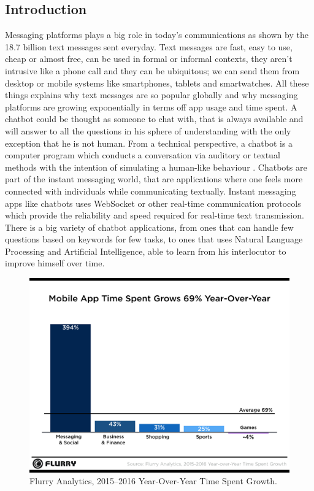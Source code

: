 \documentclass[b5paper,10pt,twoside,cucitura]{toptesi}
\begin{document}
\subsection{Introduction}
Messaging platforms plays a big role in today's communications as shown by the 18.7 billion text messages sent everyday. Text messages are fast, easy to use, cheap or almost free, can be used in formal or informal contexts, they aren't intrusive like a phone call and they can be ubiquitous; we can send them from desktop or mobile systems like smartphones, tablets and smartwatches. All these things explains why text messages are so popular globally and why messaging platforms are growing exponentially in terms off app usage and time spent.
A chatbot could be thought as someone to chat with, that is always available and will answer to all the questions in his sphere of understanding with the only exception that he is not human. From a technical perspective, a chatbot is a computer program which conducts a conversation via auditory or textual methods with the intention of simulating a human-like behaviour   \citep{techtarget}. Chatbots are part of the instant messaging world, that are applications where one feels more connected with individuals while communicating textually.
Instant messaging apps like chatbots uses WebSocket or other real-time communication protocols which provide the reliability and speed required for real-time text transmission. There is a big variety of chatbot applications, from ones that can handle few questions based on keywords for few tasks, to ones that uses Natural Language Processing and Artificial Intelligence, able to learn from his interlocutor to improve himself over time.


\begin{figure}[h]
\centering 
\includegraphics[width=\textwidth]{time_spent.png}
\caption{Flurry Analytics, 2015–2016 Year-Over-Year Time Spent Growth.}
\end{figure}
\end{document}
